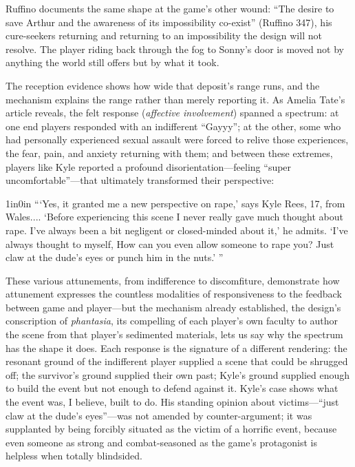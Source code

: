 Ruffino documents the same shape at the game's other wound: ``The desire to save Arthur and the awareness of its impossibility co-exist'' (Ruffino 347), his cure-seekers returning and returning to an impossibility the design will not resolve. The player riding back through the fog to Sonny's door is moved not by anything the world still offers but by what it took.

The reception evidence shows how wide that deposit's range runs, and the mechanism explains the range rather than merely reporting it. As Amelia Tate's article reveals, the felt response (\textit{affective involvement}) spanned a spectrum: at one end players responded with an indifferent ``Gayyy''; at the other, some who had personally experienced sexual assault were forced to relive those experiences, the fear, pain, and anxiety returning with them; and between these extremes, players like Kyle reported a profound disorientation---feeling ``super uncomfortable''---that ultimately transformed their perspective:

\begin{adjustwidth}{1in}{0in}
```Yes, it granted me a new perspective on rape,' says Kyle Rees, 17, from Wales.... `Before experiencing this scene I never really gave much thought about rape. I've always been a bit negligent or closed-minded about it,' he admits. `I've always thought to myself, How can you even allow someone to rape you? Just claw at the dude's eyes or punch him in the nuts.' ''
\end{adjustwidth}

These various attunements, from indifference to discomfiture, demonstrate how attunement expresses the countless modalities of responsiveness to the feedback between game and player---but the mechanism already established, the design's conscription of \textit{phantasia}, its compelling of each player's own faculty to author the scene from that player's sedimented materials, lets us say why the spectrum has the shape it does. Each response is the signature of a different rendering: the resonant ground of the indifferent player supplied a scene that could be shrugged off; the survivor's ground supplied their own past; Kyle's ground supplied enough to build the event but not enough to defend against it. Kyle's case shows what the event was, I believe, built to do. His standing opinion about victims---``just claw at the dude's eyes''---was not amended by counter-argument; it was supplanted by being forcibly situated as the victim of a horrific event, because even someone as strong and combat-seasoned as the game's protagonist is helpless when totally blindsided.

